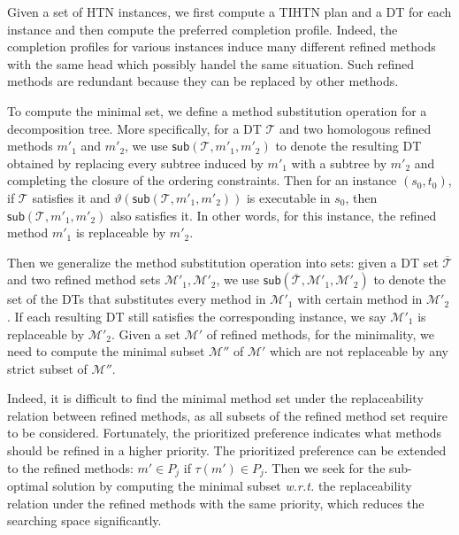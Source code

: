\documentclass[letterpaper]{article} %
\newcommand{\Methods}{\mathcal{M}}
\newcommand{\Dtree}{\mathcal{T}}
\newcommand{\yield}{\vartheta}
\newcommand{\complete}{\tau}
\newcommand{\inverseComplete}{\complete}
\begin{document}
Given a set of HTN instances, we first compute a TIHTN plan and a DT for each instance and then compute the preferred completion profile.
Indeed, the completion profiles for various instances induce many different refined methods with the same head which possibly handel the same situation.%
Such refined methods are redundant because they can be replaced by other methods.

To compute the minimal set, we define a method substitution operation for a decomposition tree.
More specifically, for a DT $\Dtree$ and two homologous refined methods $m'_1$ and $m'_2$, we use $\mathsf{sub}(\Dtree,m'_1,m'_2)$ to denote the resulting DT obtained by replacing every subtree induced by $m'_1$ with a subtree by $m'_2$ and completing the closure of the ordering constraints.
Then for an instance $(s_0,t_0)$, if $\Dtree$ satisfies it and $\yield(\mathsf{sub}(\Dtree,m'_1,m'_2))$ is executable in $s_0$, then $\mathsf{sub}(\Dtree,m'_1,m'_2)$ also satisfies it.
In other words, for this instance, the refined method $m'_1$ is replaceable by $m'_2$.

Then we generalize the method substitution operation into sets:
given a DT set $\overline{\Dtree}$ and two refined method sets $\Methods'_1,\Methods'_2$,
we use $\mathsf{sub}(\overline{\Dtree},\Methods'_1,\Methods'_2)$ to denote the set of the DTs that substitutes every method in $\Methods'_1$ with certain method in $\Methods'_2$.
If each resulting DT still satisfies the corresponding instance, we say $\Methods'_1$ is replaceable by $\Methods'_2$.
Given a set $\Methods'$ of refined methods, for the minimality, we need to compute the minimal subset $\Methods''$ of $\Methods'$ which are not replaceable by any strict subset of $\Methods''$.






























Indeed, it is difficult to find the minimal method set under the replaceability relation between refined methods, as all subsets of the refined method set require to be considered.
Fortunately, the prioritized preference indicates what methods should be refined in a higher priority.
The prioritized preference can be extended to the refined methods: $m'{\in} P_j$ if $\inverseComplete(m')\in P_j$.
Then we seek for the sub-optimal solution
by computing the minimal subset \emph{w.r.t.} the replaceability relation under the refined methods with the same priority, which reduces the searching space significantly.
\end{document}
